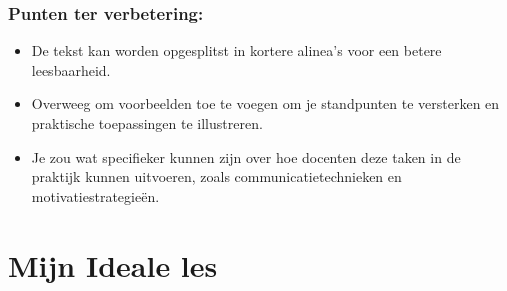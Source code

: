 \documentclass{article}
\begin{document}
                \subsubsection*{Punten ter verbetering:}
                \begin{itemize}
                    \item De tekst kan worden opgesplitst in kortere alinea's voor een betere leesbaarheid.
                    \item Overweeg om voorbeelden toe te voegen om je standpunten te versterken en praktische toepassingen te illustreren.
                    \item Je zou wat specifieker kunnen zijn over hoe docenten deze taken in de praktijk kunnen uitvoeren, zoals communicatietechnieken en motivatiestrategieën.
                \end{itemize}
    
    \newpage
        
    \section*{Mijn Ideale les}
\end{document}
